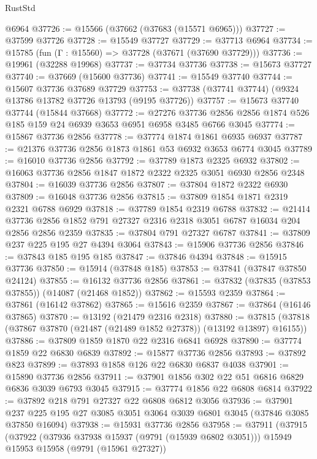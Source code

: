 \begin{lexlean}{RustStd}
\begin{coremodule}
    @6964
@37726 := @15566 (@37662 (@37683 (@15571 @6965)))
@37727 := @37599 @37726
@37728 := @15549 @37727
@37729 := @37713 @6964
@37734 := @15785 (fun (Γ : @15560) => @37728 (@37671 (@37690 @37729)))
@37736 := @19961 (@32288 @19968)
@37737 := @37734 @37736
@37738 := @15673 @37727
@37740 := @37669 (@15600 @37736)
@37741 := @15549 @37740
@37744 := @15607 @37736 @37689 @37729
@37753 := @37738 (@37741 @37744) (@9324 @13786 @13782 @37726 @13793 (@9195 @37726))
@37757 := @15673 @37740 @37744 (@15844 @37668)
@37772 := @27276
    @37736
    @2856
    @2856
    @1874
    @526
    @185
    @159
    @24
    @6939
    @3653
    @6951
    @6958
    @3485
    @6766
    @3045
@37774 := @15867 @37736 @2856
@37778 := @37774 @1874 @1861 @6935 @6937
@37787 := @21376 @37736 @2856 @1873 @1861 @53 @6932 @3653 @6774 @3045
@37789 := @16010 @37736 @2856
@37792 := @37789 @1873 @2325 @6932
@37802 := @16063 @37736 @2856 @1847 @1872 @2322 @2325 @3051 @6930 @2856 @2348
@37804 := @16039 @37736 @2856
@37807 := @37804 @1872 @2322 @6930
@37809 := @16048 @37736 @2856
@37815 := @37809 @1854 @1871 @2319 @2321 @6788 @6929
@37818 := @37789 @1854 @2319 @6788
@37832 := @21414
    @37736
    @2856
    @1852
    @791
    @27327
    @2316
    @2318
    @3051
    @6787
    @16034
    @204
    @2856
    @2856
    @2359
@37835 := @37804 @791 @27327 @6787
@37841 := @37809 @237 @225 @195 @27 @4394 @3064
@37843 := @15906 @37736 @2856
@37846 := @37843 @185 @195 @185
@37847 := @37846 @4394
@37848 := @15915 @37736
@37850 := @15914 (@37848 @185)
@37853 := @37841 (@37847 @37850 @24124)
@37855 := @16132 @37736 @2856
@37861 := @37832 (@37835 (@37853 @37855)) (@14087 (@21468 @1852))
@37862 := @15593 @2359
@37864 := @37861 (@16142 @37862)
@37865 := @15616 @2359
@37867 := @37864 (@16146 @37865)
@37870 := @13192 (@21479 @2316 @2318)
@37880 := @37815 (@37818 (@37867 @37870 (@21487 (@21489 @1852 @27378)) (@13192 @13897) @16155))
@37886 := @37809 @1859 @1870 @22 @2316 @6841 @6928
@37890 := @37774 @1859 @22 @6830 @6839
@37892 := @15877 @37736 @2856
@37893 := @37892 @823
@37899 := @37893 @1858 @126 @22 @6830 @6837 @4038
@37901 := @15890 @37736 @2856
@37911 := @37901 @1856 @302 @22 @51 @6816 @6829 @6836 @3039 @6793 @3045
@37915 := @37774 @1856 @22 @6808 @6814
@37922 := @37892 @218 @791 @27327 @22 @6808 @6812 @3056
@37936 := @37901 @237 @225 @195 @27 @3085 @3051 @3064 @3039 @6801 @3045 (@37846 @3085 @37850 @16094)
@37938 := @15931 @37736 @2856
@37958 := @37911
    (@37915
      (@37922
        (@37936 @37938 @15937 (@9791 (@15939 @6802 @3051)))
        @15949
        @15953
        @15958
        (@9791 (@15961 @27327))

\end{coremodule}
\end{lexlean}
